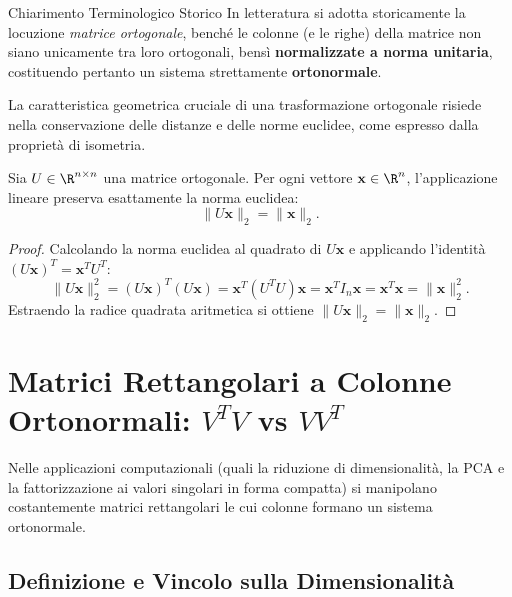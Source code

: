 \begin{noteblock}{Chiarimento Terminologico Storico}
In letteratura si adotta storicamente la locuzione \textit{matrice ortogonale}, bench\'e le colonne (e le righe) della matrice non siano unicamente tra loro ortogonali, bens\`i \textbf{normalizzate a norma unitaria}, costituendo pertanto un sistema strettamente \textbf{ortonormale}.
\end{noteblock}

La caratteristica geometrica cruciale di una trasformazione ortogonale risiede nella conservazione delle distanze e delle norme euclidee, come espresso dalla propriet\`a di isometria.

\begin{property}
\label{prop:isometria-euclidea-quadrata}
Sia $U \in \R^{n \times n}$ una matrice ortogonale. Per ogni vettore $\mathbf{x} \in \R^n$, l'applicazione lineare preserva esattamente la norma euclidea:
\begin{equation}
    \|U\mathbf{x}\|_2 = \|\mathbf{x}\|_2.
\end{equation}
\end{property}

\begin{proof}
Calcolando la norma euclidea al quadrato di $U\mathbf{x}$ e applicando l'identit\`a $(U\mathbf{x})^T = \mathbf{x}^T U^T$:
\begin{equation}
    \|U\mathbf{x}\|_2^2 = (U\mathbf{x})^T (U\mathbf{x}) = \mathbf{x}^T (U^T U) \mathbf{x} = \mathbf{x}^T I_n \mathbf{x} = \mathbf{x}^T \mathbf{x} = \|\mathbf{x}\|_2^2.
\end{equation}
Estraendo la radice quadrata aritmetica si ottiene $\|U\mathbf{x}\|_2 = \|\mathbf{x}\|_2$.
\end{proof}

\FloatBarrier
\section[Matrici Rettangolari a Colonne Ortonormali]{Matrici Rettangolari a Colonne Ortonormali: \texorpdfstring{$V^T V$}{V\textasciicircum T V} vs \texorpdfstring{$V V^T$}{V V\textasciicircum T}}

Nelle applicazioni computazionali (quali la riduzione di dimensionalit\`a, la PCA e la fattorizzazione ai valori singolari in forma compatta) si manipolano costantemente matrici rettangolari le cui colonne formano un sistema ortonormale.

\subsection{Definizione e Vincolo sulla Dimensionalit\`a}

